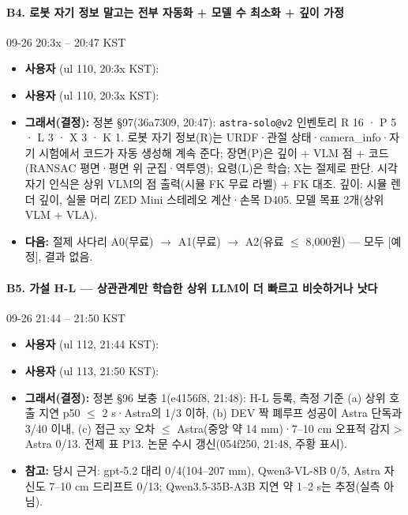 \paragraph{B4. 로봇 자기 정보 말고는 전부 자동화 + 모델 수 최소화 + 깊이 가정}
{\small 09-26 20:3x -- 20:47 KST}
\begin{itemize}
  \item \textbf{사용자} (ul 110, 20:3x KST): 
  \item \textbf{사용자} (ul 110, 20:3x KST): 
  \item \textbf{그래서(결정):} 정본 §97(36a7309, 20:47): \texttt{astra-\allowbreak{}solo@v2} 인벤토리 R 16 · P 5 · L 3 · X 3 · K 1. 로봇 자기 정보(R)는 URDF·관절 상태·camera\_info·자기 시험에서 코드가 자동 생성해 계속 준다; 장면(P)은 깊이 + VLM 점 + 코드(RANSAC 평면·평면 위 군집·역투영); 요령(L)은 학습; X는 절제로 판단. 시각 자기 인식은 상위 VLM의 점 출력(시뮬 FK 무료 라벨) + FK 대조. 깊이: 시뮬 렌더 깊이, 실물 머리 ZED Mini 스테레오 계산·손목 D405. 모델 목표 2개(상위 VLM + VLA).
  \item \textbf{다음:} 절제 사다리 A0(무료) $\rightarrow$ A1(무료) $\rightarrow$ A2(유료 $\leq$ 8,000원) --- 모두 [예정], 결과 없음.
\end{itemize}

\paragraph{B5. 가설 H-L --- 상관관계만 학습한 상위 LLM이 더 빠르고 비슷하거나 낫다}
{\small 09-26 21:44 -- 21:50 KST}
\begin{itemize}
  \item \textbf{사용자} (ul 112, 21:44 KST): 
  \item \textbf{사용자} (ul 113, 21:50 KST): 
  \item \textbf{그래서(결정):} 정본 §96 보충 1(e4156f8, 21:48): H-L 등록, 측정 기준 (a) 상위 호출 지연 p50 $\leq$ 2 s·Astra의 1/3 이하, (b) DEV 짝 폐루프 성공이 Astra 단독과 3/40 이내, (c) 접근 xy 오차 $\leq$ Astra(중앙 약 14 mm)·7--10 cm 오표적 감지 > Astra 0/13. 전제 표 P13. 논문 수시 갱신(054f250, 21:48, 주황 표시).
  \item \textbf{참고:} 당시 근거: gpt-5.2 대리 0/4(104--207 mm), Qwen3-VL-8B 0/5, Astra 자신도 7--10 cm 드리프트 0/13; Qwen3.5-35B-A3B 지연 약 1--2 s는 추정(실측 아님).
\end{itemize}

